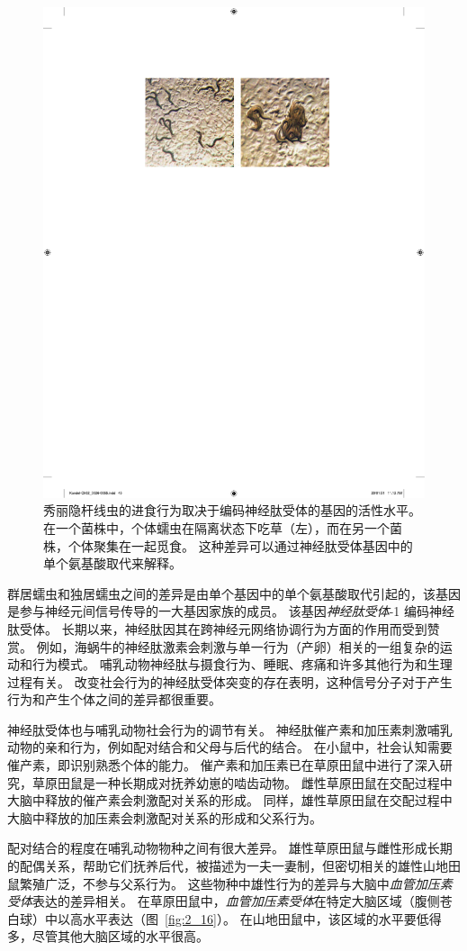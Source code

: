 \begin{figure}[htbp]
	\centering
	\includegraphics[width=0.7\linewidth]{chap02/fig_2_15}
	\caption{秀丽隐杆线虫的进食行为取决于编码神经肽受体的基因的活性水平。
		在一个菌株中，个体蠕虫在隔离状态下吃草（左），而在另一个菌株，个体聚集在一起觅食。
		这种差异可以通过神经肽受体基因中的单个氨基酸取代来解释\cite{de1998natural}。}
	\label{fig:2_15}
\end{figure}


群居蠕虫和独居蠕虫之间的差异是由单个基因中的单个氨基酸取代引起的，该基因是参与神经元间信号传导的一大基因家族的成员。
该基因\textit{神经肽受体}-1 编码神经肽受体。
长期以来，神经肽因其在跨神经元网络协调行为方面的作用而受到赞赏。
例如，海蜗牛的神经肽激素会刺激与单一行为（产卵）相关的一组复杂的运动和行为模式。
哺乳动物神经肽与摄食行为、睡眠、疼痛和许多其他行为和生理过程有关。
改变社会行为的神经肽受体突变的存在表明，这种信号分子对于产生行为和产生个体之间的差异都很重要。


神经肽受体也与哺乳动物社会行为的调节有关。
神经肽催产素和加压素刺激哺乳动物的亲和行为，例如配对结合和父母与后代的结合。
在小鼠中，社会认知需要催产素，即识别熟悉个体的能力。
催产素和加压素已在草原田鼠中进行了深入研究，草原田鼠是一种长期成对抚养幼崽的啮齿动物。
雌性草原田鼠在交配过程中大脑中释放的催产素会刺激配对关系的形成。
同样，雄性草原田鼠在交配过程中大脑中释放的加压素会刺激配对关系的形成和父系行为。


配对结合的程度在哺乳动物物种之间有很大差异。
雄性草原田鼠与雌性形成长期的配偶关系，帮助它们抚养后代，被描述为一夫一妻制，但密切相关的雄性山地田鼠繁殖广泛，不参与父系行为。
这些物种中雄性行为的差异与大脑中\textit{血管加压素受体}表达的差异相关。
在草原田鼠中，\textit{血管加压素受体}在特定大脑区域（腹侧苍白球）中以高水平表达（图~\ref{fig:2_16}）。 
在山地田鼠中，该区域的水平要低得多，尽管其他大脑区域的水平很高。


